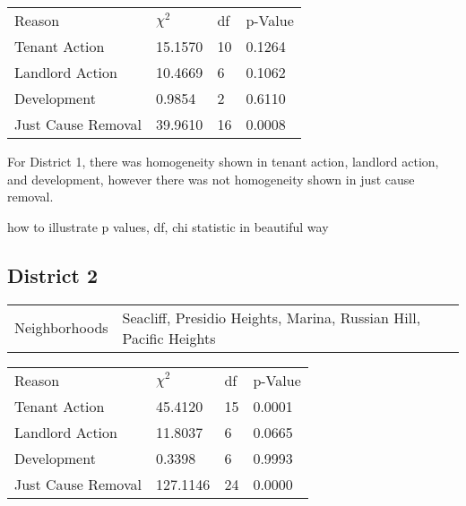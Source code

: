 \documentclass[]{article}
\begin{document}
\begin {table}[h]
\centering
\begin{tabular}{l | l | l | l}
	
	Reason	&  $\chi ^{2}$ & df & p-Value \\
	Tenant Action 		   &  15.1570  & 10  & 0.1264  \\
	Landlord Action	       &  10.4669  & 6   & 0.1062 \\
	Development			   &  0.9854   & 2   & 0.6110 \\
	Just Cause Removal	   &  39.9610  & 16  & 0.0008 \\
\end{tabular} \newline
\end{table}
\FloatBarrier

For District 1, there was homogeneity shown in tenant action, landlord action, and development, however there was not homogeneity shown in just cause removal. 

how to illustrate p values, df, chi statistic in beautiful way

\subsection{District 2}


\begin{table}[h]
	\centering
	\begin{tabular}{l | l}
		Neighborhoods & Seacliff, Presidio Heights, Marina, Russian Hill, Pacific Heights \\
	\end{tabular}
\end{table}
\FloatBarrier

\begin {table}[h]
\centering
\begin{tabular}{l | l | l | l}
	
	Reason	&  $\chi ^{2}$ & df & p-Value \\
	Tenant Action 		 & 45.4120 &  15   & 0.0001 		\\
	Landlord Action	     & 11.8037 &  6     &  	0.0665	\\
	Development			 & 0.3398 &  6    &  0.9993		\\
	Just Cause Removal	 & 127.1146   &  24 &  	0.0000		\\
\end{tabular} \newline
\end{table}
\FloatBarrier
\end{document}
